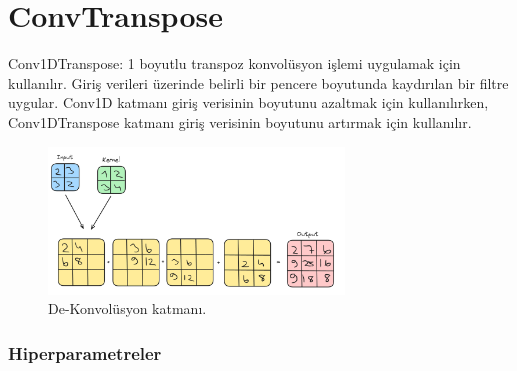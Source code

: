 \section{ConvTranspose}
Conv1DTranspose: 1 boyutlu transpoz konvolüsyon işlemi uygulamak için kullanılır. Giriş verileri üzerinde belirli bir pencere boyutunda kaydırılan bir filtre uygular. Conv1D katmanı giriş verisinin boyutunu azaltmak için kullanılırken, Conv1DTranspose katmanı giriş verisinin boyutunu artırmak için kullanılır.

\begin{figure}[h]
    \centering
    \includegraphics[width=0.7\textwidth]{images/conv_transpose_layer.png}
    \caption{De-Konvolüsyon katmanı.}
    \label{fig:enter-label}
\end{figure}

\subsubsection{Hiperparametreler}
\begin{table}[h]
\centering
{\scriptsize\renewcommand{\arraystretch}{0.4}
{}}
\end{table}

\newpage